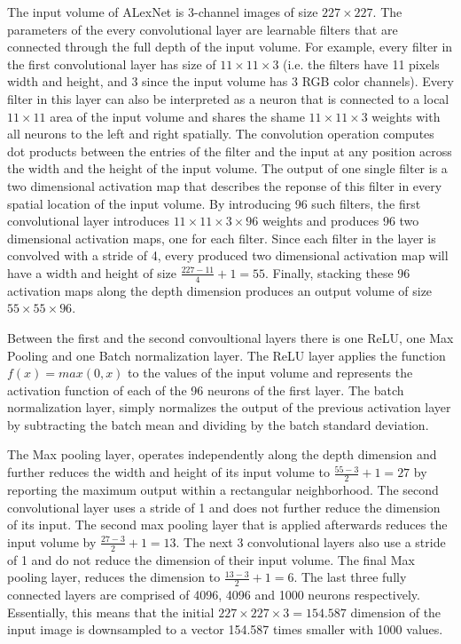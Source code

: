 \documentclass[conference,compsoc]{IEEEtran}
\begin{document}
The input volume of ALexNet is 3-channel images of size $227 \times 227$. The parameters of the every convolutional layer are learnable filters that are connected through the full depth of the input volume. For example, every filter in the first convolutional layer has size of $11 \times 11  \times 3$ (i.e. the filters have 11 pixels width and height, and 3 since the input volume has 3 RGB color channels). Every filter in this layer can also be interpreted as a neuron that is connected to a local $11 \times 11$ area of the input volume and shares the shame $11 \times 11 \times 3$ weights with all neurons to the left and right spatially. The convolution operation computes dot products between the entries of the filter and the input at any position across the width and the height of the input volume. The output of one single filter is a two dimensional activation map that describes the reponse of this filter in every spatial location of the input volume. By introducing 96 such filters, the first convolutional layer introduces $11 \times 11 \times 3 \times 96$ weights and produces 96 two dimensional activation maps, one for each filter. Since each filter in the layer is convolved with a stride of 4, every produced two dimensional activation map will have a width and height of size $\frac{227-11}{4}+1 = 55$. Finally, stacking these 96 activation maps along the depth dimension produces an output volume of size $55 \times 55 \times 96$.

Between the first and the second convoultional layers there is one ReLU, one Max Pooling and one Batch normalization layer. The ReLU layer applies the function $f(x) = max(0,x)$ to the values of the input volume and represents the activation function of each of the 96 neurons of the first layer. The batch normalization layer, simply normalizes the output of the previous activation layer by subtracting the batch mean and dividing by the batch standard deviation.

 The Max pooling layer, operates independently along the depth dimension and further reduces the width and height of its input volume to  $\frac{55-3}{2}+1 = 27$ by reporting the maximum output within a rectangular neighborhood. The second convolutional layer uses a stride of 1 and does not further reduce the dimension of its input. The second max pooling layer that is applied afterwards reduces the input volume by $\frac{27-3}{2}+1 = 13$. The next 3 convolutional layers also use a stride of 1 and do not reduce the dimension of their input volume. The final Max pooling layer, reduces the dimension to $\frac{13-3}{2}+1 = 6$. The last three fully connected layers are comprised of 4096, 4096 and 1000 neurons respectively. Essentially, this means that the initial $227 \times 227 \times 3 = 154.587$ dimension of the input image is downsampled to a vector 154.587 times smaller with 1000 values. 
  
\end{document}
